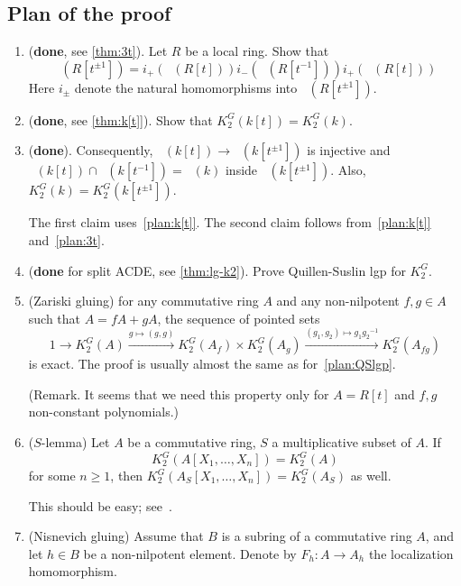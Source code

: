 \documentclass[oneside,12pt]{amsart}
\numberwithin{equation}{section}
\numberwithin{lem}{section}
\theoremstyle{definition}
\theoremstyle{remark}
\DeclareMathOperator{\St}{St^G}
\newcommand{\st}{\scriptstyle}
\begin{document}
\subsection{Plan of the proof}
\begin{enumerate}
\item\label{plan:3t} ({\bf done}, see \cref{thm:3t}). Let $R$ be a local ring. Show that
$$\St(R[t^{\pm 1}])=i_+(\St(R[t]))i_-(\St(R[t^{-1}]))i_+(\St(R[t]))$$
Here $i_\pm$ denote the natural homomorphisms into $\St(R[t^{\pm 1}])$.

\item\label{plan:k[t]} ({\bf done}, see \cref{thm:k[t]}). Show that $K_2^G(k[t])=K_2^G(k)$.

\item\label{plan:k-intersect} ({\bf done}).
Consequently, $\St(k[t])\to\St(k[t^{\pm 1}])$ is injective and $\St(k[t])\cap\St(k[t^{-1}])=\St(k)$ inside
$\St(k[t^{\pm 1}])$. Also, $K_2^G(k)=K_2^G(k[t^{\pm 1}])$.

The first claim uses~\eqref{plan:k[t]}. The second claim follows from~\eqref{plan:k[t]} and~\eqref{plan:3t}.

\item\label{plan:QSlgp} ({\bf done} for split ACDE, see \cref{thm:lg-k2}). Prove Quillen-Suslin lgp for $K_2^G$.

\item\label{plan:Zglu} (Zariski gluing) for any commutative ring $A$ and any non-nilpotent $f,g\in A$ such that
$A=fA+gA$, the sequence of pointed sets
$$1\longrightarrow K_2^G(A)\xrightarrow{\st g\mapsto (g,g)} K_2^G(A_f)\times K_2^G(A_g)
\xrightarrow{\st (g_1,g_2)\mapsto g_1{g_2}^{-1}} K_2^G(A_{fg})$$
is exact. The proof is usually almost the same as for~\eqref{plan:QSlgp}.

(Remark. It seems that we need this property only for $A=R[t]$ and $f,g$ non-constant polynomials.)

\item\label{plan:S-lemma} ($S$-lemma)
Let $A$ be a commutative ring, $S$ a multiplicative subset of $A$.
If $$K_2^G(A[X_1,\ldots,X_n])=K_2^G(A)$$ for some $n\ge 1$, then
$K_2^G(A_S[X_1,\ldots,X_n])=K_2^G(A_S)$ as well.

This should be easy; see~\cite[Lemma 3.6]{Abe}.

\item\label{plan:Nglu} (Nisnevich gluing) Assume that $B$ is a subring of a commutative ring $A$, and let
$h\in B$ be a non-nilpotent element. Denote by $F_h:A\to A_h$ the localization homomorphism.


\end{enumerate}
\end{document}
